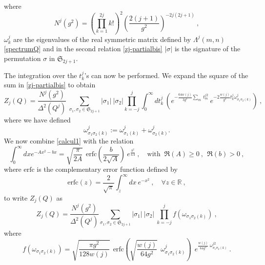 \documentclass[a4paper,11pt,twoside]{article}
\numberwithin{equation}{section}
\theoremstyle{nonumberplain}
\newcounter{and}
\begin{document}
%
where%
%
\begin{equation}
N^j(g^2) = \left(\prod_{k=1}^{2j}k!\right)^2 \left(\frac{2(j+1)}{g^2}\right)^{-2j(2j+1)} \ , \label{normal-zj}
\end{equation}
%
$\omega^j_k$ are the eigenvalues of the real symmetric matrix defined by $\Lambda^j(m,n)$ \eqref{spectrumQ} and in the second relation \eqref{zj-partialbis} $\vert\sigma\vert$ is the signature of the permutation $\sigma$ in $\mathfrak{S}_{2j+1}$.\par%
%
The integration over the $t^j_k$'s can now be performed. We expand the square of the sum in \eqref{zj-partialbis} to obtain%
%
\begin{equation}
Z_j(Q) = \frac{N^j(g^2)}{\Delta^2(Q^j)} \ \sum_{\sigma_1,\sigma_2\in\mathfrak{S}_{2j+1}} \left|\sigma_1\right| \ \left| \sigma_2 \right| \prod_{k=-j}^j \int_0^\infty dt^j_k \ \left( e^{-\frac{64w(j)}{3g^2} \underset{m}{\sum} \ t^{j2}_m} \ e^{-2\frac{w(j)}{g^2} t^j_k \omega^j_{\sigma_1\sigma_2(k)} } \right) \ , \label{calcul1} 
\end{equation}
%
where we have defined%
%
\begin{equation*}
\omega^j_{\sigma_1\sigma_2(k)} := \omega^j_{\sigma_1(k)} + \omega^j_{\sigma_2(k)}. 
\end{equation*}
%
We now combine \eqref{calcul1} with the relation%
%
\begin{equation}
\int_0^\infty dxe^{-Ax^2-bx} = \sqrt{\frac{\pi}{2A}} \ \ \mbox{erfc}\left(\frac{b}{2\sqrt{A}}\right) \ e^{\frac{b^2}{4A}} \ , \quad \mbox{with } \ \Re(A)\ge0 \ , \ \ \Re(b)>0 \ , \label{erfc-integ}
\end{equation}
%
where ${\text{erfc}}$ is the complementary error function defined by%
%
\begin{equation*}
\text{erfc}(z) = \frac{2}{\sqrt{\pi}} \int_z^\infty dx \ e^{-x^2} \ , \quad \forall z \in \mathbb{R} \ ,
\end{equation*}
%
to write $Z_j(Q)$ as%
%
\begin{equation}
Z_j(Q) = \frac{N^j(g^2)}{\Delta^2(Q^j)} \sum_{\sigma_1,\sigma_2\in\mathfrak{S}_{2j+1}} \left|\sigma_1\right| \ \left|\sigma_2\right| \ \prod_{k=-j}^j f\left(\omega_{\sigma_1\sigma_2(k)}\right) \ , \label{calcul2}
\end{equation}
where%
\begin{equation}
f\left(\omega_{\sigma_1\sigma_2(k)}\right) = \sqrt{\frac{\pi g^2}{128w(j)}} \ \ \text{erfc}\left(\sqrt{\frac{w(j)}{64g^2}} \ \ \omega^j_{\sigma_1\sigma_2(k)} \right) \ \ e^{\frac{w(j)}{64g^2} \ \omega^{j2}_{\sigma_1\sigma_2(k)}} \ .\label{functionspect}
\end{equation}
\end{document}
